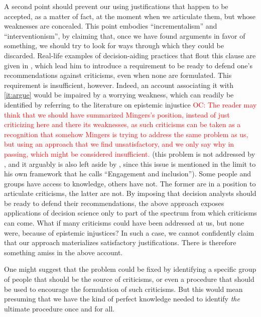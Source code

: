 \documentclass[preprint, french, english, 11pt, authoryear]{elsarticle}%
\newcommand{\commentOC}[1]{\textcolor{red}{OC: #1}}
\begin{document}
A second point should prevent our using justifications that happen to be accepted, as a matter of fact, at the moment when we articulate them, but whose weaknesses are concealed. This point embodies “incrementalism” and ``interventionism'', by claiming that, once we have found arguments in favor of something, we should try to look for ways through which they could be discarded. Real-life examples of decision-aiding practices that flout this clause are given in \cite{meinard_what_2017}, which lead him to introduce a requirement to be ready to defend one's recommendations against criticisms, even when none are formulated. This requirement is insufficient, however. Indeed, an account associating it with \cref{it:argue} would be impaired by a worrying weakness, which can readily be identified by referring to the literature on epistemic injustice \citep{fricker_epistemic_2007} \commentOC{The reader may think that we should have summarized Mingers’s position, instead of just criticizing here and there its weaknesses, as such criticisms can be taken as a recognition that somehow Mingers is trying to address the same problem as us, but using an approach that we find unsatisfactory, and we only say why in passing, which might be considered insufficient.} (this problem is not addressed by \cite{meinard_what_2017}, and it arguably is also left aside by \cite{mingers_ethics_2011}, since this issue is mentioned in the limit to his own framework that he calls ``Engagement and inclusion''). Some people and groups have access to knowledge, others have not. The former are in a position to articulate criticisms, the latter are not. By imposing that decision analysts should be ready to defend their recommendations, the above approach exposes applications of decision science only to part of the spectrum from which criticisms can come. What if many criticisms could have been addressed at us, but none were, because of epistemic injustices? In such a case, we cannot confidently claim that our approach materializes satisfactory justifications. There is therefore something amiss in the above account.

One might suggest that the problem could be fixed by identifying a specific group of people that should be the source of criticisms, or even a procedure that should be used to encourage the formulation of such criticisms. But this would mean presuming that we have the kind of perfect knowledge needed to identify \emph{the} ultimate procedure once and for all.
\end{document}
